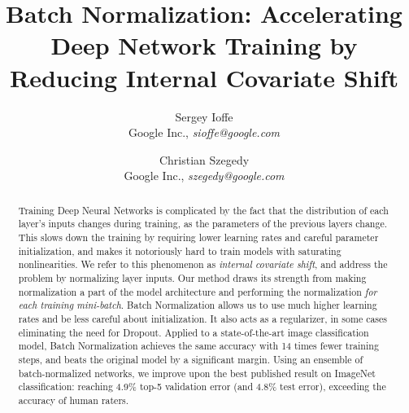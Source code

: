 \documentclass[twocolumn]{article}
\begin{document}
\newcommand{\jac}[2]{\frac{\partial #1}{\partial #2}}
\newcommand{\xhat}{\widehat{x}}
\newcommand{\yhat}{\widehat{y}}
\newcommand{\zhat}{\widehat{z}}
\newcommand{\vxhat}{\widehat\mathrm{x}}
\newcommand{\vzhat}{\widehat\mathrm{z}}
\newcommand{\setX}{\mathcal{X}}
\newcommand{\setB}{\mathcal{B}}
\newcommand{\E}{\text{E}}
\newcommand{\Var}{\text{Var}}
\newcommand{\Cov}{\text{Cov}}
\newcommand{\Fhat}{\widehat{F}}
\newcommand{\Thetahat}{\widehat{\Theta}}
\newcommand{\Norm}{\text{Norm}}
\newcommand{\BatchNorm}{\text{BN}}
\newcommand{\kk}{{(k)}}
\newcommand{\vx}{\mathrm{x}}
\newcommand{\vy}{\mathrm{y}}
\newcommand{\vz}{\mathrm{z}}
\newcommand{\vb}{\mathrm{b}}
\newcommand{\vu}{\mathrm{u}}
\newcommand{\comt}{// }
\renewcommand{\algorithmiccomment}[1]{\comt #1}
\newcommand{\BN}[2]{\text{BN}_{#2}(#1)}
\renewcommand{\algorithmicrequire}{\textbf{Input:}}
\renewcommand{\algorithmicensure}{\textbf{Output:}}
\newcommand{\mils}{\cdot 10^6}
\newcommand{\netw}[1]{{\sl #1}}
\newcommand{\norig}{\text{\sl N}}
\newcommand{\ntrain}{\norig_\mathrm{BN}^\mathrm{tr}}
\newcommand{\ninf}{\norig_\mathrm{BN}^\mathrm{inf}}
\renewcommand{\cite}[1]{\citep{#1}}


\title{Batch Normalization: Accelerating Deep Network Training by Reducing Internal Covariate Shift}

\author{Sergey Ioffe \\Google Inc., {\sl sioffe@google.com} \and
Christian Szegedy \\Google Inc., {\sl szegedy@google.com}}

\date{}

\maketitle

\begin{abstract}

Training Deep Neural Networks is complicated by the fact that the
distribution of each layer's inputs changes during training, as the
parameters of the previous layers change.  This slows down the
training by requiring lower learning rates and careful parameter
initialization, and makes it notoriously hard to train models with
saturating nonlinearities.  We refer to this phenomenon as {\em
  internal covariate shift}, and address the problem by normalizing
layer inputs.  Our method draws its strength from making normalization
a part of the model architecture and performing the normalization {\em
  for each training mini-batch}.  Batch Normalization allows us to use
much higher learning rates and be less careful about
initialization. It also acts as a regularizer, in some cases
eliminating the need for Dropout.  Applied to a state-of-the-art image
classification model, Batch Normalization achieves the same accuracy
with 14 times fewer training steps, and beats the original model by a
significant margin. 
Using an ensemble of batch-normalized networks, we
improve upon the best published result on ImageNet classification:
reaching 4.9\% top-5 validation error (and 4.8\% test error), exceeding the accuracy
of human raters.

\end{abstract}
\end{document}
